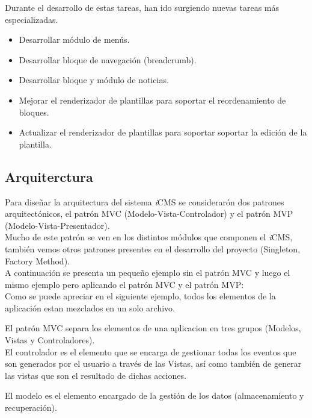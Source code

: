 Durante el desarrollo de estas tareas, han ido surgiendo nuevas tareas m\'as especializadas.

\begin{itemize}
\item Desarrollar m\'odulo de men\'us.
\item Desarrollar bloque de navegaci\'on (breadcrumb).
\item Desarrollar bloque y m\'odulo de noticias.
\item Mejorar el renderizador de plantillas para soportar el reordenamiento de bloques.
\item Actualizar el renderizador de plantillas para soportar soportar la edici\'on de la plantilla.
\end{itemize}

\subsection{Arquiterctura}
Para dise\~nar la arquitectura del sistema \textit{i}CMS se considerar\'on dos patrones arquitect\'onicos, el patr\'on MVC (Modelo-Vista-Controlador) y el patr\'on MVP (Modelo-Vista-Presentador).\\

Mucho de este patr\'on se ven en los distintos m\'odulos que componen el \textit{i}CMS, tambi\'en vemos otros patrones presentes en el desarrollo del proyecto (Singleton, Factory Method).\\

A continuaci\'on se presenta un peque\~no ejemplo sin el patr\'on MVC y luego el mismo ejemplo pero aplicando el patr\'on MVC y el patr\'on MVP:\\

Como se puede apreciar en el siguiente ejemplo, todos los elementos de la aplicaci\'on estan mezclados en un solo archivo.



El patr\'on MVC separa los elementos de una aplicacion en tres grupos (Modelos, Vistas y Controladores).\\

El controlador es el elemento que se encarga de gestionar todas los eventos que son generados por el usuario a trav\'es de las Vistas, as\'i como tambi\'en de generar las vistas que son el resultado de dichas acciones.



El modelo es el elemento encargado de la gesti\'on de los datos (almacenamiento y recuperaci\'on).

